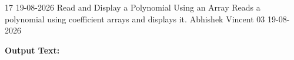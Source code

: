 \clearpage
\label{prog:17}
\programhead
  {17}
  {19-08-2026}
  {Read and Display a Polynomial Using an Array}
  {Reads a polynomial using coefficient arrays and displays it.}
  {Abhishek Vincent}
  {03}
  {19-08-2026}

\divider
\textbf{Output Text:}\par
\vspace{2pt}

